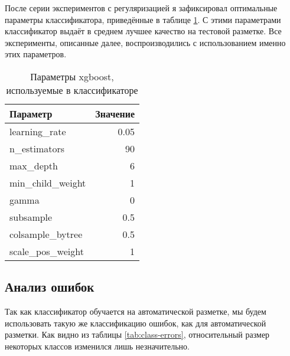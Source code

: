 \documentclass[14pt,russian]{extreport}
\begin{document}
После серии экспериментов с регуляризацией я зафиксировал оптимальные параметры
классификатора, приведённые в таблице \ref{tab:params}. С этими параметрами
классификатор выдаёт в среднем лучшее качество на тестовой разметке. Все
эксперименты, описанные далее, воспроизводились с использованием именно этих
параметров.

\begin{table}
  \centering
  \begin{tabular}{l|r}
    Параметр & Значение \\
    \hline
    learning\_rate & 0.05 \\
    n\_estimators & 90 \\
    max\_depth & 6 \\
    min\_child\_weight & 1 \\
    gamma & 0 \\
    subsample & 0.5 \\
    colsample\_bytree & 0.5 \\
    scale\_pos\_weight & 1 \\
  \end{tabular}
  \caption{Параметры xgboost, используемые в классификаторе}
  \label{tab:params}
\end{table}

\subsection{Анализ ошибок}

Так как классификатор обучается на автоматической разметке, мы будем
использовать такую же классификацию ошибок, как для автоматической разметки.
Как видно из таблицы \ref{tab:class-errors}, относительный размер некоторых классов
изменился лишь незначительно.
\end{document}
